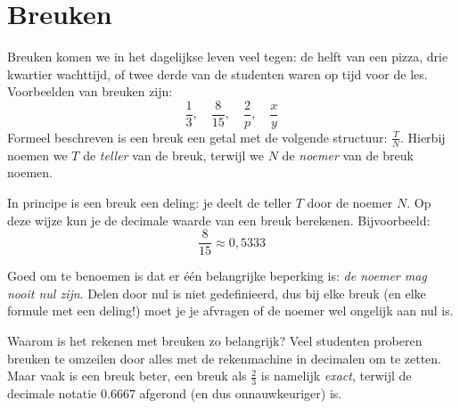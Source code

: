 \chapter{Breuken}
\label{chap:breuken}

Breuken komen we in het dagelijkse leven veel tegen: de helft van een 
pizza, drie kwartier wachttijd, of twee derde van de studenten waren op tijd voor de les. Voorbeelden van breuken zijn: 
\[
    \frac{1}{3}, \quad \frac{8}{15}, \quad \frac{2}{p}, \quad \frac{x}{y}
\]
Formeel beschreven is een breuk een getal met de volgende structuur: 
$\frac{T}{N}$. Hierbij noemen we $T$ de \emph{teller} van de breuk, 
terwijl we $N$ de \emph{noemer} van de breuk noemen.

\begin{figure}[H]
    \centering
    \label{fig:breuk}
\end{figure}

In principe is een breuk een deling: je deelt de teller $T$ door de 
noemer $N$. Op deze wijze kun je de decimale waarde van een breuk 
berekenen. Bijvoorbeeld: 
\[
    \frac{8}{15}\approx 0{,}5333
\]

Goed om te benoemen is dat er \'e\'en belangrijke beperking is: \emph{de noemer mag nooit nul zijn}. Delen door nul is niet gedefinieerd, dus bij elke breuk (en elke formule met een deling!) moet je je afvragen of de noemer wel ongelijk aan nul is.

Waarom is het rekenen met breuken zo belangrijk? Veel studenten proberen 
breuken te omzeilen door alles met de rekenmachine in decimalen om te 
zetten. Maar vaak is een breuk beter, een breuk als $\frac{2}{3}$ is namelijk \emph{exact}, terwijl de decimale notatie $0.6667$ afgerond (en dus onnauwkeuriger) is.

